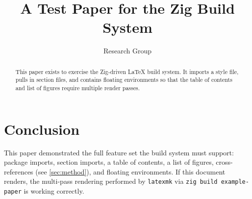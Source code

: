 \documentclass[11pt, a4paper]{article}
\title{A Test Paper for the Zig Build System}
\author{Research Group}
\begin{document}
\maketitle

\begin{abstract}
	This paper exists to exercise the Zig-driven LaTeX build system. It imports a
	style file, pulls in section files, and contains floating environments so that
	the table of contents and list of figures require multiple render passes.
\end{abstract}

\tableofcontents
\listoffigures





\section{Conclusion}
\label{sec:conclusion}

This paper demonstrated the full feature set the build system must support:
package imports, section imports, a table of contents, a list of figures,
cross-references (see \cref{sec:method}), and floating environments. If this
document renders, the multi-pass rendering performed by \texttt{latexmk} via
\texttt{zig build example-paper} is working correctly.

\clearpage
\appendix
\theendnotes
\end{document}
